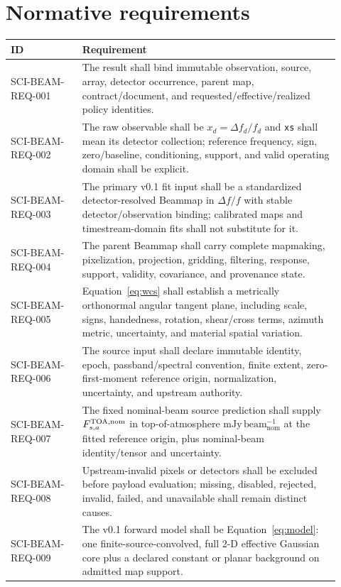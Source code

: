\section{Normative requirements}
\label{sec:requirements}
\footnotesize
\begin{longtable}{>{\raggedright\arraybackslash\ttfamily\scriptsize}p{0.20\linewidth}L{0.72\linewidth}}
\toprule ID & Requirement \\
\midrule
SCI-BEAM-REQ-001 & The result shall bind immutable observation, source, array, detector occurrence, parent map, contract/document, and requested/effective/realized policy identities. \\
SCI-BEAM-REQ-002 & The raw observable shall be $x_d=\Delta f_d/f_d$ and \texttt{xs} shall mean its detector collection; reference frequency, sign, zero/baseline, conditioning, support, and valid operating domain shall be explicit. \\
SCI-BEAM-REQ-003 & The primary v0.1 fit input shall be a standardized detector-resolved Beammap in $\Delta f/f$ with stable detector/observation binding; calibrated maps and timestream-domain fits shall not substitute for it. \\
SCI-BEAM-REQ-004 & The parent Beammap shall carry complete mapmaking, pixelization, projection, gridding, filtering, response, support, validity, covariance, and provenance state. \\
SCI-BEAM-REQ-005 & Equation~\ref{eq:wcs} shall establish a metrically orthonormal angular tangent plane, including scale, signs, handedness, rotation, shear/cross terms, azimuth metric, uncertainty, and material spatial variation. \\
SCI-BEAM-REQ-006 & The source input shall declare immutable identity, epoch, passband/spectral convention, finite extent, zero-first-moment reference origin, normalization, uncertainty, and upstream authority. \\
SCI-BEAM-REQ-007 & The fixed nominal-beam source prediction shall supply $F^{\rm TOA,nom}_{s,a}$ in top-of-atmosphere $\mathrm{mJy\,beam_{nom}^{-1}}$ at the fitted reference origin, plus nominal-beam identity/tensor and uncertainty. \\
SCI-BEAM-REQ-008 & Upstream-invalid pixels or detectors shall be excluded before payload evaluation; missing, disabled, rejected, invalid, failed, and unavailable shall remain distinct causes. \\
SCI-BEAM-REQ-009 & The v0.1 forward model shall be Equation~\ref{eq:model}: one finite-source-convolved, full 2-D effective Gaussian core plus a declared constant or planar background on admitted map support. \\

\end{longtable}
